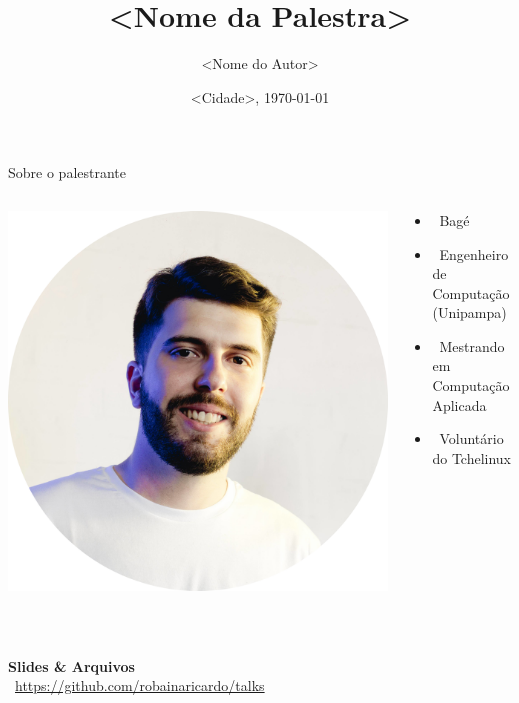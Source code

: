 \documentclass[aspectratio=1610, 12pt]{beamer}
\institute{<Nome do Evento>}
\title{<Nome da Palestra>}
\author{<Nome do Autor>}
\date{<Cidade>, \today}
\begin{document}
	
\begin{frame}
	\titlepage
	\thispagestyle{empty}
\end{frame}

\begin{frame}{Sobre o palestrante}
	
	\begin{columns}
			
		\begin{column}{0.3\textwidth}
			\includegraphics[scale = 0.17]{fig/fig_eu.png}
		\end{column}
		
		\begin{column}{0.7\textwidth}  %
			\textbf{\insertauthor}
			\begin{itemize}
				\item \faMapMarker \ Bagé
				\item \faMortarBoard \ Engenheiro de Computação (Unipampa)
				\item \faMortarBoard \ Mestrando em Computação Aplicada %
				\item \faLinux \ Voluntário do Tchelinux
			\end{itemize}
		\end{column}
	\end{columns}
	
	\\
		
	\centering
	\vskip1cm
		
	\textbf{Slides \& Arquivos } \\
	\faGithub\ \url{https://github.com/robainaricardo/talks}
		
\end{frame}
\end{document}
